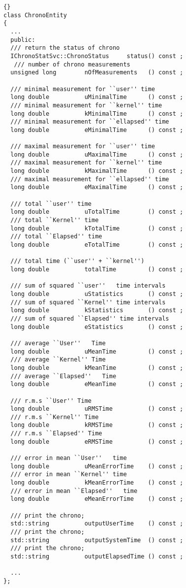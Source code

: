 \documentclass{lhcbnote}
\begin{document}
\begin{lstlisting}{}
class ChronoEntity
{
  ...
  public:
  /// return the status of chrono
  IChronoStatSvc::ChronoStatus     status() const ;
   /// number of chrono measurements
  unsigned long        nOfMeasurements   () const ;

  /// minimal measurement for ``user'' time
  long double          uMinimalTime      () const ;
  /// minimal measurement for ``kernel'' time
  long double          kMinimalTime      () const ;
  /// minimal measurement for ``ellapsed'' time
  long double          eMinimalTime      () const ;

  /// maximal measurement for ``user'' time
  long double          uMaximalTime      () const ;
  /// maximal measurement for ``kernel'' time
  long double          kMaximalTime      () const ;
  /// maximal measurement for ``ellapsed'' time
  long double          eMaximalTime      () const ;

  /// total ``user'' time
  long double          uTotalTime        () const ;
  /// total ``Kernel'' time
  long double          kTotalTime        () const ;
  /// total ``Elapsed'' time
  long double          eTotalTime        () const ;

  /// total time (``user'' + ``kernel'')
  long double          totalTime         () const ;

  /// sum of squared ``user''   time intervals
  long double          uStatistics       () const ;
  /// sum of squared ``Kernel'' time intervals
  long double          kStatistics       () const ;
  /// sum of squared ``Elapsed'' time intervals
  long double          eStatistics       () const ;

  /// average ``User''   Time
  long double          uMeanTime         () const ;
  /// average ``Kernel'' Time
  long double          kMeanTime         () const ;
  /// average ``Elapsed''   Time
  long double          eMeanTime         () const ;

  /// r.m.s ``User'' Time
  long double          uRMSTime          () const ;
  /// r.m.s ``Kernel'' Time
  long double          kRMSTime          () const ;
  /// r.m.s ``Elapsed'' Time
  long double          eRMSTime          () const ;

  /// error in mean ``User''   time
  long double          uMeanErrorTime    () const ;
  /// error in mean ``Kernel'' time
  long double          kMeanErrorTime    () const ;
  /// error in mean ``Elapsed''   time
  long double          eMeanErrorTime    () const ;

  /// print the chrono;
  std::string          outputUserTime    () const ;
  /// print the chrono;
  std::string          outputSystemTime  () const ;
  /// print the chrono;
  std::string          outputElapsedTime () const ;

  ...
};
\end{lstlisting}
\end{document}
